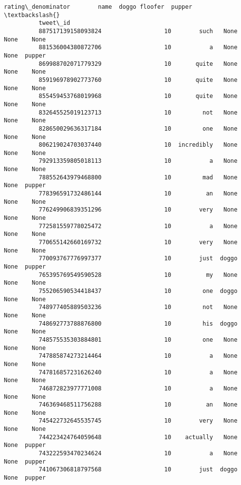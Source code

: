 \documentclass[11pt]{article}
\begin{document}
\begin{Verbatim}[commandchars=\\\{\}]
                              rating\_denominator        name  doggo floofer  pupper  \textbackslash{}
          tweet\_id                                                                    
          887517139158093824                  10        such   None    None    None   
          881536004380872706                  10           a   None    None  pupper   
          869988702071779329                  10       quite   None    None    None   
          859196978902773760                  10       quite   None    None    None   
          855459453768019968                  10       quite   None    None    None   
          832645525019123713                  10         not   None    None    None   
          828650029636317184                  10         one   None    None    None   
          806219024703037440                  10  incredibly   None    None    None   
          792913359805018113                  10           a   None    None    None   
          788552643979468800                  10         mad   None    None  pupper   
          778396591732486144                  10          an   None    None    None   
          776249906839351296                  10        very   None    None    None   
          772581559778025472                  10           a   None    None    None   
          770655142660169732                  10        very   None    None    None   
          770093767776997377                  10        just  doggo    None  pupper   
          765395769549590528                  10          my   None    None    None   
          755206590534418437                  10         one  doggo    None    None   
          748977405889503236                  10         not   None    None    None   
          748692773788876800                  10         his  doggo    None    None   
          748575535303884801                  10         one   None    None    None   
          747885874273214464                  10           a   None    None    None   
          747816857231626240                  10           a   None    None    None   
          746872823977771008                  10           a   None    None    None   
          746369468511756288                  10          an   None    None    None   
          745422732645535745                  10        very   None    None    None   
          744223424764059648                  10    actually   None    None  pupper   
          743222593470234624                  10           a   None    None  pupper   
          741067306818797568                  10        just  doggo    None  pupper   

\end{Verbatim}
\end{document}
